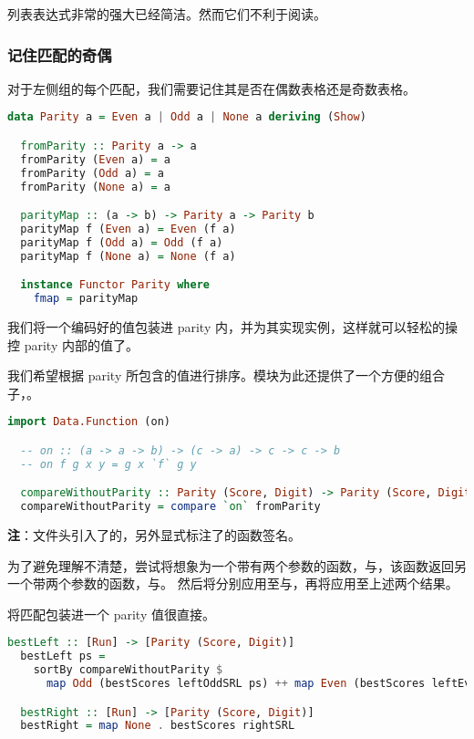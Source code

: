 \documentclass[./main.tex]{subfiles}
\begin{document}
列表表达式非常的强大已经简洁。然而它们不利于阅读。

\subsubsection*{记住匹配的奇偶}

对于左侧组的每个匹配，我们需要记住其是否在偶数表格还是奇数表格。

\begin{lstlisting}[language=Haskell]
  data Parity a = Even a | Odd a | None a deriving (Show)

  fromParity :: Parity a -> a
  fromParity (Even a) = a
  fromParity (Odd a) = a
  fromParity (None a) = a

  parityMap :: (a -> b) -> Parity a -> Parity b
  parityMap f (Even a) = Even (f a)
  parityMap f (Odd a) = Odd (f a)
  parityMap f (None a) = None (f a)

  instance Functor Parity where
    fmap = parityMap
\end{lstlisting}

我们将一个编码好的值包装进 parity 内，并为其实现实例，这样就可以轻松的操控 parity 内部的值了。

我们希望根据 parity 所包含的值进行排序。模块为此还提供了一个方便的组合子，。

\begin{lstlisting}[language=Haskell]
  import Data.Function (on)

  -- on :: (a -> a -> b) -> (c -> a) -> c -> c -> b
  -- on f g x y = g x `f` g y

  compareWithoutParity :: Parity (Score, Digit) -> Parity (Score, Digit) -> Ordering
  compareWithoutParity = compare `on` fromParity
\end{lstlisting}

\textbf{注}：文件头引入了的，另外显式标注了的函数签名。

为了避免理解不清楚，尝试将想象为一个带有两个参数的函数，与，该函数返回另一个带两个参数的函数，与。
然后将分别应用至与，再将应用至上述两个结果。

将匹配包装进一个 parity 值很直接。

\begin{lstlisting}[language=Haskell]
  bestLeft :: [Run] -> [Parity (Score, Digit)]
  bestLeft ps =
    sortBy compareWithoutParity $
      map Odd (bestScores leftOddSRL ps) ++ map Even (bestScores leftEvenSRL ps)

  bestRight :: [Run] -> [Parity (Score, Digit)]
  bestRight = map None . bestScores rightSRL
\end{lstlisting}
\end{document}

